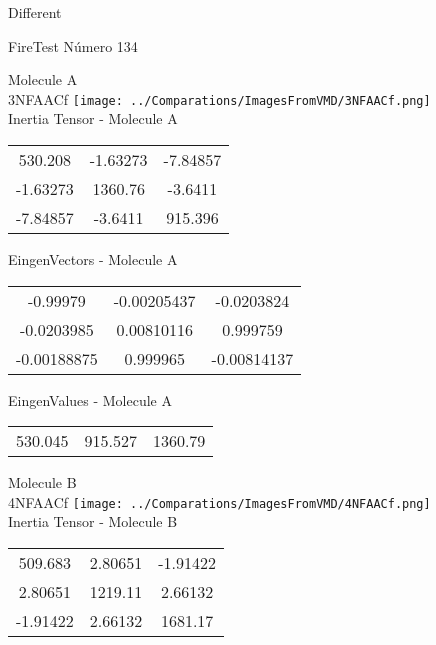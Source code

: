 \begin{center}
\vtab
\vtab
\textcolor{NavyBlue}{\Large Different}
\end{center}

 \newpage

\vtab[-2cm]
\begin{center}
{\large FireTest \tab Número 134}
\end{center}
\begin{multicols}{2}
\begin{center}

Molecule A \\ 
3NFAACf
\texttt{[image: ../Comparations/ImagesFromVMD/3NFAACf.png]}
\\
Inertia Tensor - Molecule A \\
\vtab

\begin{tabular}{|c c c|}
530.208	 & 	-1.63273	 & 	-7.84857	 \\
-1.63273	 & 	1360.76	 & 	-3.6411	 \\
-7.84857	 & 	-3.6411	 & 	915.396
\end{tabular}

\vtab
 EingenVectors - Molecule A     \\
\vtab
\begin{tabular}{|c c c|}
-0.99979	 & 	-0.00205437	 & 	-0.0203824	 \\
-0.0203985	 & 	0.00810116	 & 	0.999759	 \\
-0.00188875	 & 	0.999965	 & 	-0.00814137
\end{tabular}

\vtab
 EingenValues - Molecule A     \\
\vtab
\begin{tabular}{|c c c|}
530.045	 & 	915.527	 & 	1360.79	 \\
\end{tabular}
\columnbreak

Molecule B \\ 
4NFAACf
\texttt{[image: ../Comparations/ImagesFromVMD/4NFAACf.png]}
\\
Inertia Tensor - Molecule B \\
\vtab

\begin{tabular}{|c c c|}
509.683	 & 	2.80651	 & 	-1.91422	 \\
2.80651	 & 	1219.11	 & 	2.66132	 \\
-1.91422	 & 	2.66132	 & 	1681.17
\end{tabular}


\end{center}
\end{multicols}
